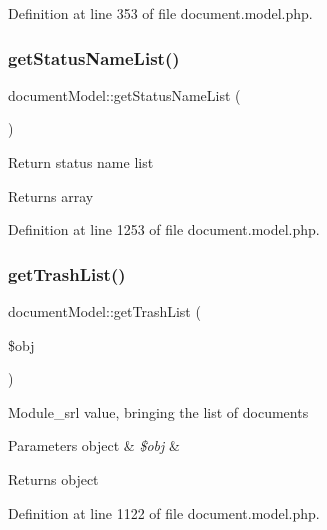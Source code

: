Definition at line 353 of file document.\+model.\+php.

\hypertarget{classdocumentModel_a47541348b4212971ce508fb2a24ce4f3}{}\label{classdocumentModel_a47541348b4212971ce508fb2a24ce4f3} 
\subsubsection{\texorpdfstring{get\+Status\+Name\+List()}{getStatusNameList()}}
{\footnotesize\ttfamily document\+Model\+::get\+Status\+Name\+List (\begin{DoxyParamCaption}{ }\end{DoxyParamCaption})}

Return status name list \begin{DoxyReturn}{Returns}
array 
\end{DoxyReturn}


Definition at line 1253 of file document.\+model.\+php.

\hypertarget{classdocumentModel_a428c7beb4eb06031f1412a58c017ea20}{}\label{classdocumentModel_a428c7beb4eb06031f1412a58c017ea20} 
\subsubsection{\texorpdfstring{get\+Trash\+List()}{getTrashList()}}
{\footnotesize\ttfamily document\+Model\+::get\+Trash\+List (\begin{DoxyParamCaption}\item[{}]{\$obj }\end{DoxyParamCaption})}

Module\+\_\+srl value, bringing the list of documents 
\begin{DoxyParams}[1]{Parameters}
object & {\em \$obj} & \\
\hline
\end{DoxyParams}
\begin{DoxyReturn}{Returns}
object 
\end{DoxyReturn}


Definition at line 1122 of file document.\+model.\+php.

\hypertarget{classdocumentModel_a04a1f3814d77f78a588c61ab78ef1274}{}\label{classdocumentModel_a04a1f3814d77f78a588c61ab78ef1274} 

